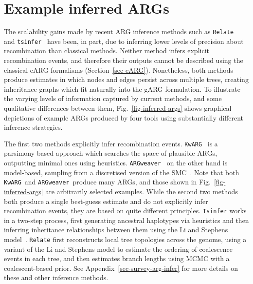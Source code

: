 \documentclass[9pt,twocolumn,twoside]{gsajnl}
\newcommand{\tsinfer}[0]{\texttt{tsinfer}}
\newcommand{\kwarg}[0]{\texttt{KwARG}}
\newcommand{\argweaver}[0]{\texttt{ARGweaver}}
\newcommand{\relate}[0]{\texttt{Relate}}
\begin{document}
\section{Example inferred ARGs}
\label{sec-example-inferred-args}
The scalability gains made by recent ARG inference methods
such as \relate~\citep{speidel2019method} and
\tsinfer~\citep{kelleher2019inferring}
have been, in part, due to inferring lower levels of precision about
recombination than classical methods.
Neither method infers
explicit recombination events, and therefore their outputs cannot
be described using the classical eARG formalisms (Section~\ref{sec-eARG}).
Nonetheless, both methods produce estimates in which nodes and edges
persist across multiple trees, creating
inheritance graphs which fit naturally into the gARG formulation.
To illustrate the varying levels of information captured
by current methods, and some qualitative differences between them,
Fig.~\ref{fig-inferred-args} shows graphical depictions of
example ARGs produced by four tools using substantially
different inference strategies.

The first two methods explicitly infer recombination events.
\kwarg~\citep{ignatieva2021kwarg} is a parsimony based approach
which searches the space of plausible ARGs,
outputting minimal ones using heuristics.
\argweaver~\citep{rasmussen2014genome} on the other hand is
model-based, sampling from a discretised version of the
SMC~\citep{mcvean2005approximating,marjoram2006fast}.
Note that both \kwarg\ and \argweaver\ produce many ARGs,
and those shown in Fig.~\ref{fig-inferred-args} are arbitrarily selected
examples.
While the second two methods
both produce a single best-guess estimate and
do not explicitly infer recombination events, they are based on
quite different principles.
\texttt{Tsinfer} works in a two-step process, first generating ancestral
haplotypes via heuristics and then inferring inheritance relationships
between them using the Li and Stephens model~\citep{li2003modeling}.
\texttt{Relate} first reconstructs local tree topologies across the genome,
using a variant of the Li and Stephens model to estimate the
ordering of coalescence events in each tree, and then estimates
branch lengths using MCMC with a coalescent-based prior.
See Appendix~\ref{sec-survey-arg-infer} for more details on these
and other inference methods.
\end{document}
